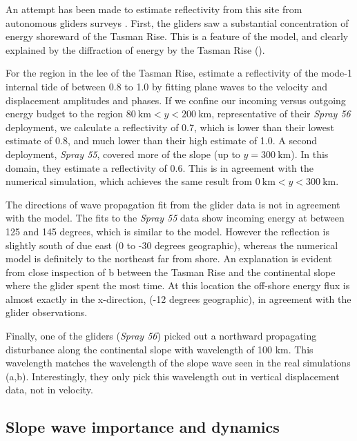 \documentclass[12pt]{article}
\begin{document}
An attempt has been made to estimate reflectivity from this site from autonomous gliders surveys \citep{johnstonetal15}.  First, the gliders saw a substantial concentration of energy shoreward of the Tasman Rise.  This is a feature of the model, and clearly explained by the diffraction of energy by the Tasman Rise ().   

For the region in the lee of the Tasman Rise, \citet{johnstonetal15} estimate a reflectivity of the mode-1 internal tide of between 0.8 to 1.0 by fitting plane waves to the velocity and displacement amplitudes and phases.  If we confine our incoming versus outgoing energy budget to the region $80\ \mathrm{km}< y < 200\ \mathrm{km}$, representative of their \emph{Spray 56} deployment, we calculate a reflectivity of 0.7, which is lower than their lowest estimate of 0.8, and much lower than their high estimate of 1.0.  A second deployment, \emph{Spray 55}, covered more of the slope (up to $y=300\ \mathrm{km}$).  In this domain, they estimate a reflectivity of 0.6.  This is in agreement with the numerical simulation, which achieves  the same result from $0\ \mathrm{km}< y < 300\ \mathrm{km}$.  

The directions of wave propagation fit from the glider data is not in agreement with the model.  The fits to the \emph{Spray 55} data show incoming energy at between 125 and 145 degrees, which is similar to the model.  However the reflection is slightly south of due east (0 to -30 degrees geographic), whereas the numerical model is definitely to the northeast far from shore.  An explanation is evident from close inspection of b between the Tasman Rise and the continental slope where the glider spent the most time.  At this location the off-shore energy flux is almost exactly in the x-direction, (-12 degrees geographic), in agreement with the glider observations.  

Finally, one of the gliders (\emph{Spray 56}) picked out a northward propagating disturbance along the continental slope with wavelength of 100 km.  This wavelength matches the wavelength of the slope wave seen in the real simulations (a,b).  Interestingly, they only pick this wavelength out in vertical displacement data, not in velocity.  


\subsection{Slope wave importance and dynamics}
\end{document}
